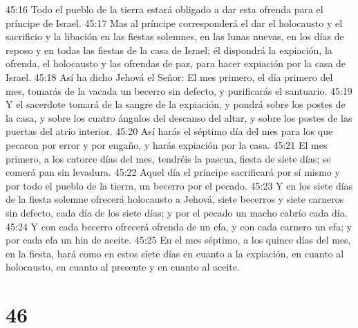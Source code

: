 45:16 Todo el pueblo de la tierra estará obligado a dar esta ofrenda para el príncipe de Israel.  
45:17 Mas al príncipe corresponderá el dar el holocausto y el sacrificio y la libación en las fiestas solemnes, en las lunas nuevas, en los días de reposo y en todas las fiestas de la casa de Israel; él dispondrá la expiación, la ofrenda, el holocausto y las ofrendas de paz, para hacer expiación por la casa de Israel.  
45:18 Así ha dicho Jehová el Señor: El mes primero, el día primero del mes, tomarás de la vacada un becerro sin defecto, y purificarás el santuario.  
45:19 Y el sacerdote tomará de la sangre de la expiación, y pondrá sobre los postes de la casa, y sobre los cuatro ángulos del descanso del altar, y sobre los postes de las puertas del atrio interior.  
45:20 Así harás el séptimo día del mes para los que pecaron por error y por engaño, y harás expiación por la casa.  
45:21 El mes primero, a los catorce días del mes, tendréis la pascua, fiesta de siete días; se comerá pan sin levadura. 
45:22 Aquel día el príncipe sacrificará por sí mismo y por todo el pueblo de la tierra, un becerro por el pecado.  
45:23 Y en los siete días de la fiesta solemne ofrecerá holocausto a Jehová, siete becerros y siete carneros sin defecto, cada día de los siete días; y por el pecado un macho cabrío cada día.  
45:24 Y con cada becerro ofrecerá ofrenda de un efa,  y con cada carnero un efa; y por cada efa un hin de aceite.  
45:25 En el mes séptimo, a los quince días del mes, en la fiesta, hará como en estos siete días  en cuanto a la expiación, en cuanto al holocausto, en cuanto al presente y en cuanto al aceite.  

\chapter{46}

